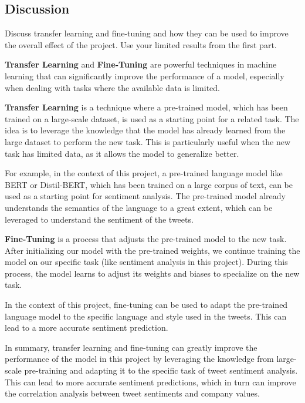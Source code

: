 \documentclass[12pt]{article}
\begin{document}
\subsection{Discussion}
\begin{qsolve}
    Discuss transfer learning and fine-tuning and how they can be used to 
    improve the overall effect of the project. Use your limited results 
    from the first part.
\end{qsolve}

\textbf{Transfer Learning} and \textbf{Fine-Tuning} are powerful techniques 
in machine learning that can significantly improve the performance of a 
model, especially when dealing with tasks where the available data is 
limited.

\textbf{Transfer Learning} is a technique where a pre-trained model, which 
has been trained on a large-scale dataset, is used as a starting point for 
a related task. The idea is to leverage the knowledge that the model has 
already learned from the large dataset to perform the new task. This is 
particularly useful when the new task has limited data, as it allows the 
model to generalize better.

For example, in the context of this project, a pre-trained language model 
like BERT or Distil-BERT, which has been trained on a large corpus of text, 
can be used as a starting point for sentiment analysis. The pre-trained 
model already understands the semantics of the language to a great extent, 
which can be leveraged to understand the sentiment of the tweets.

\textbf{Fine-Tuning} is a process that adjusts the pre-trained model to the new 
task. After initializing our model with the pre-trained weights, we 
continue training the model on our specific task (like sentiment analysis 
in this project). During this process, the model learns to adjust its
weights and biases to specialize on the new task.

In the context of this project, fine-tuning can be used to adapt the 
pre-trained language model to the specific language and style used in the 
tweets. This can lead to a more accurate sentiment prediction.

In summary, transfer learning and fine-tuning can greatly improve the 
performance of the model in this project by leveraging the knowledge from 
large-scale pre-training and adapting it to the specific task of tweet 
sentiment analysis. This can lead to more accurate sentiment predictions, 
which in turn can improve the correlation analysis between tweet 
sentiments and company values.
\end{document}
